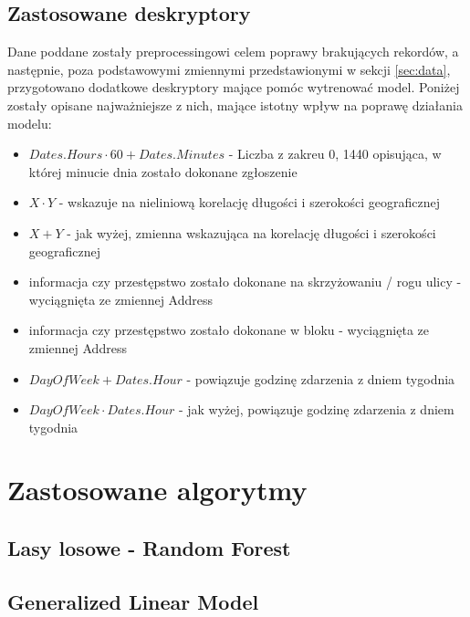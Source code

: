 \documentclass[11pt]{article} %
\begin{document}
\subsection{Zastosowane deskryptory}

Dane poddane zostały preprocessingowi celem poprawy brakujących rekordów, a następnie, poza podstawowymi zmiennymi przedstawionymi w sekcji \ref{sec:data}, przygotowano dodatkowe deskryptory mające pomóc wytrenować model. Poniżej zostały opisane najważniejsze z nich, mające istotny wpływ na poprawę działania modelu:

\begin{itemize}
\item $Dates.Hours \cdot 60 + Dates.Minutes$ - Liczba z zakreu {0, 1440} opisująca, w której minucie dnia zostało dokonane zgłoszenie

\item $X \cdot Y$ - wskazuje na nieliniową korelację długości i szerokości geograficznej

\item $X + Y$ - jak wyżej, zmienna wskazująca na korelację długości i szerokości geograficznej

\item informacja czy przestępstwo zostało dokonane na skrzyżowaniu / rogu ulicy - wyciągnięta ze zmiennej Address

\item informacja czy przestępstwo zostało dokonane w bloku - wyciągnięta ze zmiennej Address

\item $DayOfWeek + Dates.Hour$  - powiązuje godzinę zdarzenia z dniem tygodnia

\item $DayOfWeek \cdot Dates.Hour$ -  jak wyżej, powiązuje godzinę zdarzenia z dniem tygodnia

\end{itemize}


\section{Zastosowane algorytmy}
\subsection{Lasy losowe - Random Forest}

\subsection{Generalized Linear Model}
\end{document}
